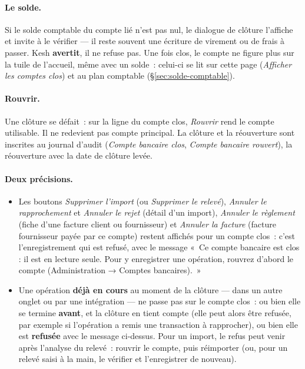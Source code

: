 \documentclass[a4paper,11pt,oneside]{article}
\begin{document}
\paragraph{Le solde.} Si le solde comptable du compte lié n'est pas nul, le dialogue de clôture
l'affiche et invite à le vérifier --- il reste souvent une écriture de virement ou de frais à
passer. Kesh \textbf{avertit}, il ne refuse pas. Une fois clos, le compte ne figure plus sur la
tuile de l'accueil, même avec un solde~: celui-ci se lit sur cette page (\emph{Afficher les
comptes clos}) et au plan comptable (\S\ref{sec:solde-comptable}).

\paragraph{Rouvrir.} Une clôture se défait~: sur la ligne du compte clos, \emph{Rouvrir} rend
le compte utilisable. Il ne redevient pas compte principal. La clôture et la réouverture sont
inscrites au journal d'audit (\emph{Compte bancaire clos}, \emph{Compte bancaire rouvert}), la
réouverture avec la date de clôture levée.

\paragraph{Deux précisions.}
\begin{itemize}
    \item Les boutons \emph{Supprimer l'import} (ou \emph{Supprimer le relevé}), \emph{Annuler le rapprochement} et
          \emph{Annuler le rejet} (détail d'un import), \emph{Annuler le règlement} (fiche d'une
          facture client ou fournisseur) et \emph{Annuler la facture} (facture fournisseur
          payée par ce compte) restent affichés pour un compte clos~: c'est l'enregistrement
          qui est refusé, avec le message «~Ce compte bancaire est clos : il est
          en lecture seule. Pour y enregistrer une opération, rouvrez d'abord le compte
          (Administration → Comptes bancaires).~»
    \item Une opération \textbf{déjà en cours} au moment de la clôture --- dans un autre
          onglet ou par une intégration --- ne passe pas sur le compte clos~: ou bien elle se
          termine \textbf{avant}, et la clôture en tient compte (elle peut alors être refusée,
          par exemple si l'opération a remis une transaction à rapprocher), ou bien elle est
          \textbf{refusée} avec le message ci-dessus. Pour un import, le refus peut venir après
          l'analyse du relevé~: rouvrir le compte, puis réimporter (ou, pour un relevé saisi à la
          main, le vérifier et l'enregistrer de nouveau).
\end{itemize}
\end{document}
